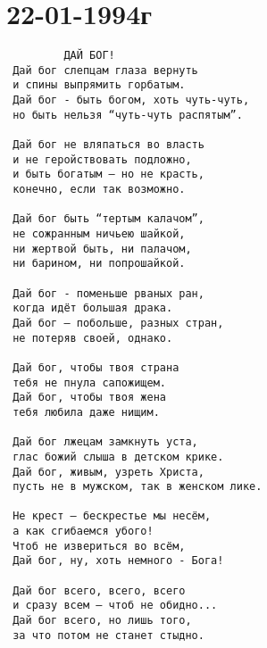 \chapter{22-01-1994г}

\begin{verbatim}
         ДАЙ БОГ!
 Дай бог слепцам глаза вернуть
 и спины выпрямить горбатым.
 Дай бог - быть богом, хоть чуть-чуть,
 но быть нельзя “чуть-чуть распятым”.

 Дай бог не вляпаться во власть
 и не геройствовать подложно,
 и быть богатым — но не красть,
 конечно, если так возможно.

 Дай бог быть “тертым калачом”,
 не сожранным ничьею шайкой,
 ни жертвой быть, ни палачом,
 ни барином, ни попрошайкой.

 Дай бог - поменьше рваных ран,
 когда идёт большая драка.
 Дай бог – побольше, разных стран,
 не потеряв своей, однако.

 Дай бог, чтобы твоя страна
 тебя не пнула сапожищем.
 Дай бог, чтобы твоя жена
 тебя любила даже нищим.

 Дай бог лжецам замкнуть уста,
 глас божий слыша в детском крике.
 Дай бог, живым, узреть Христа,
 пусть не в мужском, так в женском лике.

 Не крест — бескрестье мы несём,
 а как сгибаемся убого!
 Чтоб не извериться во всём,
 Дай бог, ну, хоть немного - Бога!

 Дай бог всего, всего, всего
 и сразу всем — чтоб не обидно...
 Дай бог всего, но лишь того,
 за что потом не станет стыдно. 
\end{verbatim}
\author{Евгений Евтушенко}

